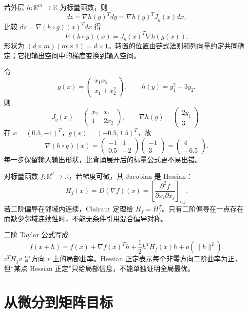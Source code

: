 若外层 $h:\mathbb R^m\to\mathbb R$ 为标量函数，则
\[
 dz=\nabla h(y)^Tdy
 =\nabla h(y)^TJ_g(x)dx,
\]
比较 $dz=\nabla(h\circ g)(x)^Tdx$ 得
\[
 \nabla(h\circ g)(x)=J_g(x)^T\nabla h(g(x)).
\]
形状为 $(d\times m)(m\times1)=d\times1$。转置的位置由链式法则和列向量约定共同确定；它把输出空间中的梯度变换到输入空间。


令
\[
 g(x)=\begin{pmatrix}x_1x_2\\x_1+x_2^2\end{pmatrix},
 \qquad h(y)=y_1^2+3y_2.
\]
则
\[
 J_g(x)=\begin{pmatrix}x_2&x_1\\1&2x_2\end{pmatrix},
 \qquad \nabla h(y)=\begin{pmatrix}2y_1\\3\end{pmatrix}.
\]
在 $x=(0.5,-1)^T$，$g(x)=(-0.5,1.5)^T$，故
\[
 \nabla(h\circ g)(x)
 =\begin{pmatrix}-1&1\\0.5&-2\end{pmatrix}
  \begin{pmatrix}-1\\3\end{pmatrix}
 =\begin{pmatrix}4\\-6.5\end{pmatrix}.
\]
每一步保留输入输出形状，比背诵展开后的标量公式更不易出错。


对标量函数 $f:\mathbb R^d\to\mathbb R$，若梯度可微，其 Jacobian 是 Hessian：
\[
 H_f(x)=D(\nabla f)(x)
 =\left[\frac{\partial^2f}{\partial x_i\partial x_j}\right]_{i,j}.
\]
若二阶偏导在邻域内连续，Clairaut 定理给 $H_f=H_f^T$。只有二阶偏导在一点存在而缺少邻域连续性时，不能无条件引用混合偏导对称。



二阶 Taylor 公式写成
\[
 f(x+h)=f(x)+\nabla f(x)^Th
 +\frac12h^TH_f(x)h+o(\lVert h\rVert^2).
\]
$v^TH_fv$ 是方向 $v$ 上的局部曲率。Hessian 正定表示每个非零方向二阶曲率为正，但“某点 Hessian 正定”只给局部信息，不能单独证明全局最优。

\section{从微分到矩阵目标}

